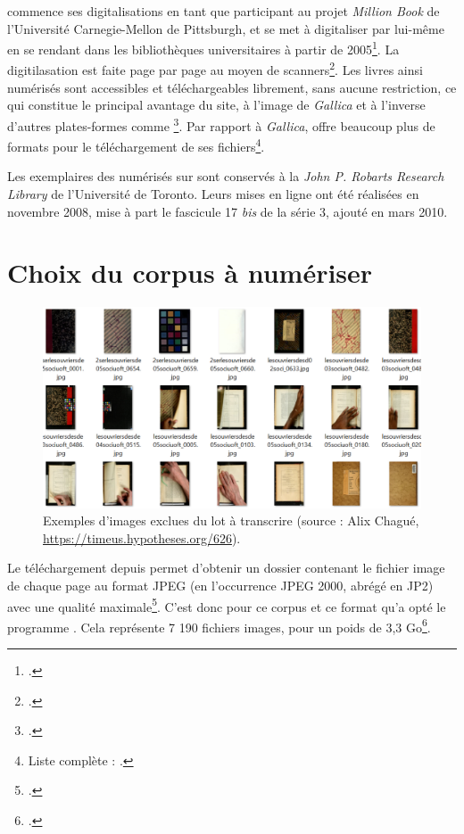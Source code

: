 \ia{} commence ses digitalisations en tant que participant au projet \textit{Million Book} de l'Université Carnegie-Mellon de Pittsburgh, et se met à digitaliser par lui-même en se rendant dans les bibliothèques universitaires à partir de 2005\footcite[p. 4]{Brewster2}. La digitilasation est faite page par page au moyen de scanners\footcite[p. 4]{Brewster2}. Les livres ainsi numérisés sont accessibles  et téléchargeables librement, sans aucune restriction, ce qui constitue le principal avantage du site, à l'image de \textit{Gallica} et à l'inverse d'autres plates-formes comme \gb\footcite[p. 1]{Brewster2}. Par rapport à \textit{Gallica}, \ia{} offre beaucoup plus de formats pour le téléchargement de ses fichiers\footnote{Liste complète : \cite[p. 33]{chague}.}.

Les exemplaires des \odm{} numérisés sur \ia{} sont conservés à la \textit{John P. Robarts Research Library} de l'Université de Toronto. Leurs mises en ligne ont été réalisées en novembre 2008, mise à part le fascicule 17 \textit{bis} de la série 3, ajouté en mars 2010.

\section{Choix du corpus à numériser}

\begin{figure}[ht]
    \centering
    \includegraphics[width=15cm]{img/ex_tri.png}
    \caption[Images exclues du lot à transcrire]{Exemples d'images exclues du lot à transcrire (source : Alix Chagué, \url{https://timeus.hypotheses.org/626}).}
    \label{fig:ex_tri}
\end{figure}

Le téléchargement depuis \ia{} permet d'obtenir un dossier contenant le fichier image de chaque page au format JPEG (en l'occurrence JPEG 2000, abrégé en JP2) avec une qualité maximale\footcite{chague2}. C'est donc pour ce corpus et ce format qu'a opté le programme \timeus. Cela représente 7 190 fichiers images, pour un poids de 3,3 Go\footcite{chague2}.


